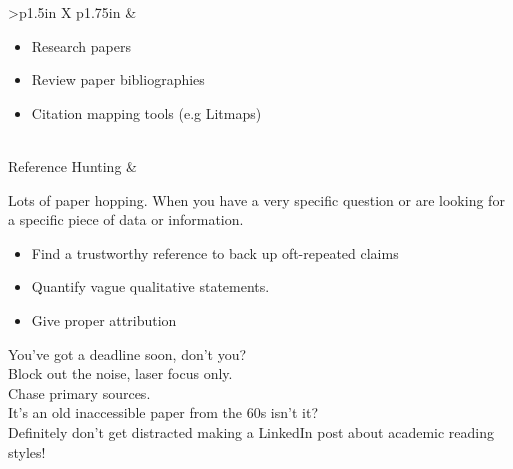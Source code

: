 \documentclass[8pt]{extarticle}
\begin{document}
\begin{tabularx}{\linewidth}{>{\bfseries}p{1.5in} X p{1.75in}}
                                                            &   \begin{minipage}[t]{\linewidth}
                                                                \begin{itemize}[nosep,leftmargin=*]
                                                                    \item Research papers
                                                                \end{itemize}
                                                                \vspace{1em}
                                                                \begin{itemize}[nosep,leftmargin=*]
                                                                    \item Review paper bibliographies
                                                                    \item Citation mapping tools (e.g Litmaps)
                                                                \end{itemize}
                                                                \end{minipage}
                                                                        \\
    \addlinespace
    Reference Hunting           &   \begin{minipage}[t]{\linewidth}
                                    Lots of paper hopping.
                                    When you have a very specific question or are looking for a specific piece of data or information.
                                    \begin{itemize}[nosep]
                                        \item Find a trustworthy reference to back up oft-repeated claims
                                        \item Quantify vague qualitative statements.
                                        \item Give proper attribution
                                    \end{itemize}
                                    You've got a deadline soon, don't you? \\
                                    Block out the noise, laser focus only. \\
                                    Chase primary sources. \\
                                    It's an old inaccessible paper from the 60s isn't it? \\
                                    Definitely don't get distracted making a LinkedIn post about academic reading styles!
                                    \end{minipage}


\end{tabularx}
\end{document}
